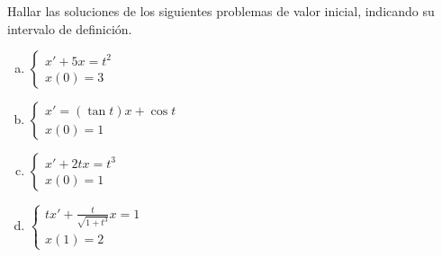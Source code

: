 \documentclass[../main.tex]{subfiles}
\begin{document}
\begin{problem}
	Hallar las soluciones de los siguientes problemas de valor inicial, 
	indicando su intervalo de definición.
	\begin{multicols}{2}
	\begin{enumerate}[a)]
		\item \(\displaystyle 
				\begin{cases}
					x' + 5x = t^2 \\
					x(0) = 3
				\end{cases}\)

		\item \(\displaystyle 
				\begin{cases}
					x' = (\tan t)x + \cos t \\
					x(0) = 1
				\end{cases}\)

		\item \(\displaystyle 
				\begin{cases}
					x' + 2tx = t^3 \\
					x(0) = 1
				\end{cases}\)

		\item \(\displaystyle 
				\begin{cases}
					tx' + \frac{t}{\sqrt{1 + t^3}}x = 1 \\
					x(1) = 2
				\end{cases}\)
	\end{enumerate}
	\end{multicols}
\end{problem}
\end{document}
